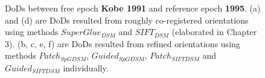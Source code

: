 \begin{figure}[htbp]
\begin{center}
		\caption{{\scriptsize \ac{DoD}s between free epoch \textbf{Kobe 1991} and reference epoch \textbf{1995}. (a) and (d) are \ac{DoD}s resulted from roughly co-registered orientations using methods $SuperGlue_{DSM}$ and $SIFT_{DSM}$ (elaborated in Chapter 3). (b, c, e, f) are \ac{DoD}s resulted from refined orientations using methods $Patch_{SpGDSM}$, $Guided_{SpGDSM}$, $Patch_{SIFTDSM}$ and $Guided_{SIFTDSM}$ individually.}}
		\label{PreciseDoDKobe}
	\end{center}
\end{figure} 


